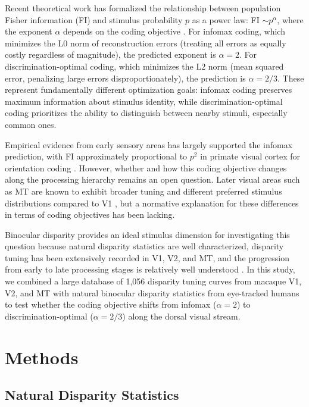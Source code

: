 \documentclass[12pt]{article}
\begin{document}
Recent theoretical work has formalized the relationship between population Fisher information (FI) and stimulus probability $p$ as a power law: FI $\sim p^{\alpha}$, where the exponent $\alpha$ depends on the coding objective \citep{ganguli2012efficient, wei2015bayesian}. For infomax coding, which minimizes the L0 norm of reconstruction errors (treating all errors as equally costly regardless of magnitude), the predicted exponent is $\alpha = 2$. For discrimination-optimal coding, which minimizes the L2 norm (mean squared error, penalizing large errors disproportionately), the prediction is $\alpha = 2/3$. These represent fundamentally different optimization goals: infomax coding preserves maximum information about stimulus identity, while discrimination-optimal coding prioritizes the ability to distinguish between nearby stimuli, especially common ones.

Empirical evidence from early sensory areas has largely supported the infomax prediction, with FI approximately proportional to $p^{2}$ in primate visual cortex for orientation coding \citep{ganguli2012efficient}. However, whether and how this coding objective changes along the processing hierarchy remains an open question. Later visual areas such as MT are known to exhibit broader tuning and different preferred stimulus distributions compared to V1 \citep{deangelis1998cortical, cumming2001organization}, but a normative explanation for these differences in terms of coding objectives has been lacking.

Binocular disparity provides an ideal stimulus dimension for investigating this question because natural disparity statistics are well characterized, disparity tuning has been extensively recorded in V1, V2, and MT, and the progression from early to late processing stages is relatively well understood \citep{cumming2001organization, deangelis1998cortical}. In this study, we combined a large database of 1,056 disparity tuning curves from macaque V1, V2, and MT with natural binocular disparity statistics from eye-tracked humans to test whether the coding objective shifts from infomax ($\alpha = 2$) to discrimination-optimal ($\alpha = 2/3$) along the dorsal visual stream.

\section{Methods}

\subsection{Natural Disparity Statistics}
\end{document}
